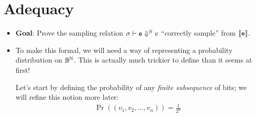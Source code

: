 \documentclass{tufte-handout}
\begin{document}
\section{Adequacy}
\begin{itemize}
  \item \textbf{Goal}: Prove the sampling relation $\sigma \vdash \texttt{e}
  \Downarrow^S v$ ``correctly sample'' from $\left \llbracket {\texttt{e}} \right \rrbracket$.

  \item To make this formal, we will need a way of representing a probability
  distribution on $\mathbb{B}^{\mathbb{N}}$.  This is actually much trickier to define than
  it seems at first! 

  Let's start by defining the probability of any \emph{finite subsequence} of bits; we 
  will refine this notion more later:
  \begin{align}
    \Pr((v_1, v_2, \dots, v_n)) = \frac{1}{2^n}
  \end{align}
  


\end{itemize}
\end{document}

